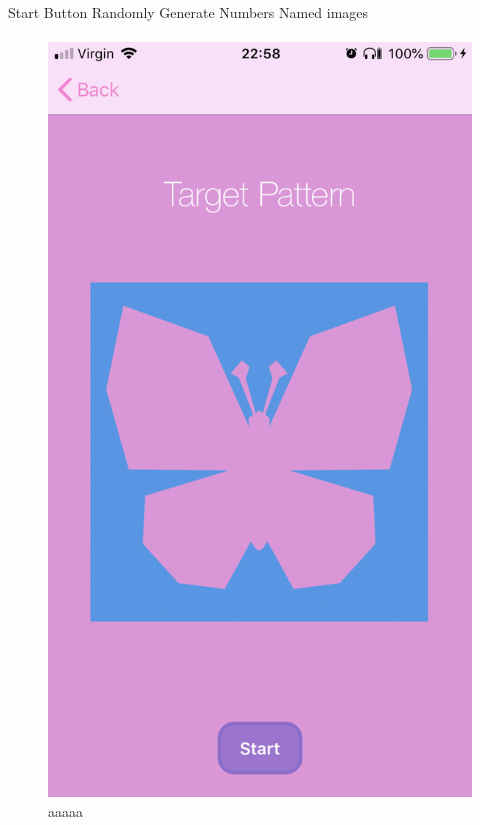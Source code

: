 \documentclass[11pt]{article}
\begin{document}
            Start Button
             Randomly Generate Numbers
             Named images

    
            \paragraph{}
            \begin{figure}[!ht]
                        \begin{minipage}{0.45\textwidth}
                            \centering \includegraphics[width=0.7\linewidth]{KiriZen/simpleTarget.png}
                            \caption{aaaaa}
                            \label{fig:kiriZen-simpleTarget}
                        \end{minipage}\hfill
                        \begin{minipage}{0.45\textwidth}
                            \centering

\end{minipage}
\end{figure}
\end{document}
